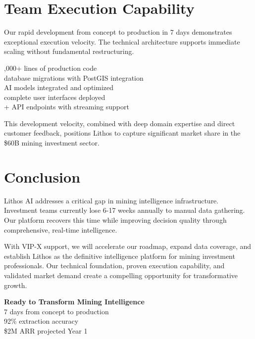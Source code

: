 \documentclass[11pt]{article}
\begin{document}
\section{Team Execution Capability}

Our rapid development from concept to production in 7 days demonstrates exceptional execution velocity. The technical architecture supports immediate scaling without fundamental restructuring.

\begin{metricbox}
\faCode {},000+ lines of production code\\
\faDatabase {} database migrations with PostGIS integration\\
\faRobot {} AI models integrated and optimized\\
\faUsers {} complete user interfaces deployed\\
\faServer {}+ API endpoints with streaming support
\end{metricbox}

This development velocity, combined with deep domain expertise and direct customer feedback, positions Lithos to capture significant market share in the \$60B mining investment sector.

\section{Conclusion}

Lithos AI addresses a critical gap in mining intelligence infrastructure. Investment teams currently lose 6-17 weeks annually to manual data gathering. Our platform recovers this time while improving decision quality through comprehensive, real-time intelligence.

With VIP-X support, we will accelerate our roadmap, expand data coverage, and establish Lithos as the definitive intelligence platform for mining investment professionals. Our technical foundation, proven execution capability, and validated market demand create a compelling opportunity for transformative growth.

\vspace{1cm}
\begin{center}
\begin{tcolorbox}[colback=lithosblue!5, colframe=lithosblue, boxrule=2pt, arc=3mm, width=0.8\textwidth]
\centering
\textbf{\Large Ready to Transform Mining Intelligence}\\[0.5em]
\textcolor{lithosdark}{7 days from concept to production}\\
\textcolor{lithosdark}{92\% extraction accuracy}\\
\textcolor{lithosdark}{\$2M ARR projected Year 1}
\end{tcolorbox}
\end{center}
\end{document}
